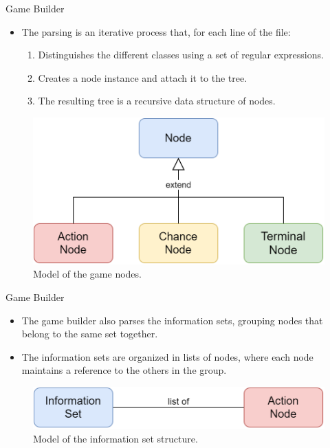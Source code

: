 \documentclass[11pt]{beamer}
\begin{document}
\begin{frame}{Game Builder}
\begin{itemize}
\item The parsing is an iterative process that, for each line of the file:
\begin{enumerate}
\item Distinguishes the different classes using a set of regular expressions.
\item Creates a node instance and attach it to the tree.
\item The resulting tree is a recursive data structure of nodes.
\end{enumerate}
\end{itemize}
\begin{figure}[hbtp]
		\centering
		\includegraphics[scale=0.2]{images/img_02.png}
		\caption{Model of the game nodes.}
\end{figure}
\end{frame}

\begin{frame}{Game Builder}
\begin{itemize}
\item The game builder also parses the information sets, grouping nodes that belong to the same set together.
\item The information sets are organized in lists of nodes, where each node maintains a reference to the others in the group.
\end{itemize}
\begin{figure}[hbtp]
		\centering
		\includegraphics[scale=0.25]{images/img_03.png}
		\caption{Model of the information set structure.}
\end{figure}
\end{frame}
\end{document}
